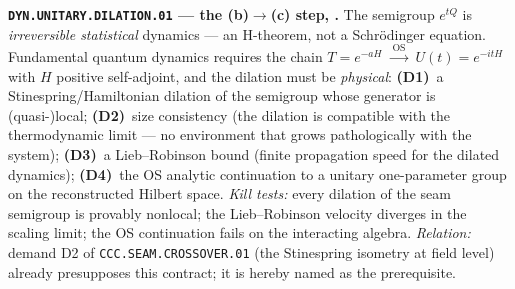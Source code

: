 \documentclass[11pt,a4paper]{article}
\begin{document}
\par\smallskip\noindent\textbf{\texttt{DYN.UNITARY.DILATION.01} --- the (b)$\to$(c) step,
\mO.}  The semigroup $e^{tQ}$ is \emph{irreversible statistical} dynamics --- an H-theorem, not
a Schr\"odinger equation.  Fundamental quantum dynamics requires the chain
$T=e^{-aH}\;\xrightarrow{\ \mathrm{OS}\ }\;U(t)=e^{-itH}$ with $H$ positive self-adjoint, and
the dilation must be \emph{physical}: \textbf{(D1)}~a Stinespring/Hamiltonian dilation of the
semigroup whose generator is (quasi-)local; \textbf{(D2)}~size consistency (the dilation is
compatible with the thermodynamic limit --- no environment that grows pathologically with the
system); \textbf{(D3)}~a Lieb--Robinson bound (finite propagation speed for the dilated
dynamics); \textbf{(D4)}~the OS analytic continuation to a unitary one-parameter group on the
reconstructed Hilbert space.  \emph{Kill tests:} every dilation of the seam semigroup is
provably nonlocal; the Lieb--Robinson velocity diverges in the scaling limit; the OS
continuation fails on the interacting algebra.  \emph{Relation:} demand D2 of
\texttt{CCC.SEAM.CROSSOVER.01} (the Stinespring isometry at field level) already presupposes
this contract; it is hereby named as the prerequisite.
\end{document}
